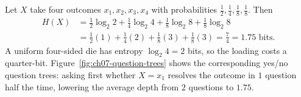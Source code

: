 \begin{example}
\label{ch07:loaded-die}
Let $X$ take four outcomes $x_1, x_2, x_3, x_4$ with probabilities $\frac{1}{2}, \frac{1}{4}, \frac{1}{8}, \frac{1}{8}$. Then
\begin{align*}
  H(X) &= \frac{1}{2}\log_2 2 + \frac{1}{4}\log_2 4 + \frac{1}{8}\log_2 8 + \frac{1}{8}\log_2 8 \\
       &= \frac{1}{2}(1) + \frac{1}{4}(2) + \frac{1}{8}(3) + \frac{1}{8}(3) = \frac{7}{4} = 1.75\text{ bits}.
\end{align*}
A uniform four-sided die has entropy $\log_2 4 = 2$ bits, so the loading costs a quarter-bit. Figure~\ref{fig:ch07-question-trees} shows the corresponding yes/no question trees: asking first whether $X = x_1$ resolves the outcome in $1$ question half the time, lowering the average depth from $2$ questions to $1.75$.
\end{example}

